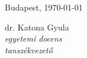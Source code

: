 \documentclass[12pt,a4paper]{article}
\begin{document}
\vspace{1cm}\vfill
Budapest, \today
\begin{flushright}
\begin{minipage}{0.5\textwidth}
\begin{center}
	dr. Katona Gyula\\
	\textit{egyetemi docens}\\
	\textit{tanszékvezető}
\end{center}
\end{minipage}
\end{flushright}
\vfill
\end{document}
